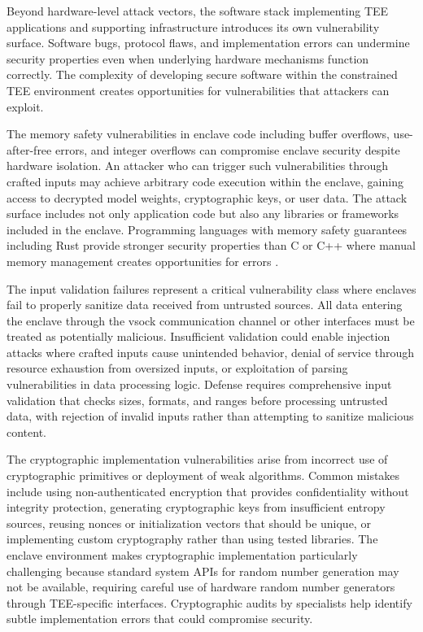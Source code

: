 Beyond hardware-level attack vectors, the software stack implementing TEE applications and supporting infrastructure introduces its own vulnerability surface. Software bugs, protocol flaws, and implementation errors can undermine security properties even when underlying hardware mechanisms function correctly. The complexity of developing secure software within the constrained TEE environment creates opportunities for vulnerabilities that attackers can exploit.

The memory safety vulnerabilities in enclave code including buffer overflows, use-after-free errors, and integer overflows can compromise enclave security despite hardware isolation. An attacker who can trigger such vulnerabilities through crafted inputs may achieve arbitrary code execution within the enclave, gaining access to decrypted model weights, cryptographic keys, or user data. The attack surface includes not only application code but also any libraries or frameworks included in the enclave. Programming languages with memory safety guarantees including Rust provide stronger security properties than C or C++ where manual memory management creates opportunities for errors \cite{sgx_explained}.

The input validation failures represent a critical vulnerability class where enclaves fail to properly sanitize data received from untrusted sources. All data entering the enclave through the vsock communication channel or other interfaces must be treated as potentially malicious. Insufficient validation could enable injection attacks where crafted inputs cause unintended behavior, denial of service through resource exhaustion from oversized inputs, or exploitation of parsing vulnerabilities in data processing logic. Defense requires comprehensive input validation that checks sizes, formats, and ranges before processing untrusted data, with rejection of invalid inputs rather than attempting to sanitize malicious content.

The cryptographic implementation vulnerabilities arise from incorrect use of cryptographic primitives or deployment of weak algorithms. Common mistakes include using non-authenticated encryption that provides confidentiality without integrity protection, generating cryptographic keys from insufficient entropy sources, reusing nonces or initialization vectors that should be unique, or implementing custom cryptography rather than using tested libraries. The enclave environment makes cryptographic implementation particularly challenging because standard system APIs for random number generation may not be available, requiring careful use of hardware random number generators through TEE-specific interfaces. Cryptographic audits by specialists help identify subtle implementation errors that could compromise security.

